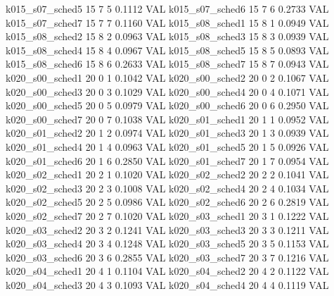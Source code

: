   k015_s07_sched5                   15    7   5    0.1112  VAL
  k015_s07_sched6                   15    7   6    0.2733  VAL
  k015_s07_sched7                   15    7   7    0.1160  VAL
  k015_s08_sched1                   15    8   1    0.0949  VAL
  k015_s08_sched2                   15    8   2    0.0963  VAL
  k015_s08_sched3                   15    8   3    0.0939  VAL
  k015_s08_sched4                   15    8   4    0.0967  VAL
  k015_s08_sched5                   15    8   5    0.0893  VAL
  k015_s08_sched6                   15    8   6    0.2633  VAL
  k015_s08_sched7                   15    8   7    0.0943  VAL
  k020_s00_sched1                   20    0   1    0.1042  VAL
  k020_s00_sched2                   20    0   2    0.1067  VAL
  k020_s00_sched3                   20    0   3    0.1029  VAL
  k020_s00_sched4                   20    0   4    0.1071  VAL
  k020_s00_sched5                   20    0   5    0.0979  VAL
  k020_s00_sched6                   20    0   6    0.2950  VAL
  k020_s00_sched7                   20    0   7    0.1038  VAL
  k020_s01_sched1                   20    1   1    0.0952  VAL
  k020_s01_sched2                   20    1   2    0.0974  VAL
  k020_s01_sched3                   20    1   3    0.0939  VAL
  k020_s01_sched4                   20    1   4    0.0963  VAL
  k020_s01_sched5                   20    1   5    0.0926  VAL
  k020_s01_sched6                   20    1   6    0.2850  VAL
  k020_s01_sched7                   20    1   7    0.0954  VAL
  k020_s02_sched1                   20    2   1    0.1020  VAL
  k020_s02_sched2                   20    2   2    0.1041  VAL
  k020_s02_sched3                   20    2   3    0.1008  VAL
  k020_s02_sched4                   20    2   4    0.1034  VAL
  k020_s02_sched5                   20    2   5    0.0986  VAL
  k020_s02_sched6                   20    2   6    0.2819  VAL
  k020_s02_sched7                   20    2   7    0.1020  VAL
  k020_s03_sched1                   20    3   1    0.1222  VAL
  k020_s03_sched2                   20    3   2    0.1241  VAL
  k020_s03_sched3                   20    3   3    0.1211  VAL
  k020_s03_sched4                   20    3   4    0.1248  VAL
  k020_s03_sched5                   20    3   5    0.1153  VAL
  k020_s03_sched6                   20    3   6    0.2855  VAL
  k020_s03_sched7                   20    3   7    0.1216  VAL
  k020_s04_sched1                   20    4   1    0.1104  VAL
  k020_s04_sched2                   20    4   2    0.1122  VAL
  k020_s04_sched3                   20    4   3    0.1093  VAL
  k020_s04_sched4                   20    4   4    0.1119  VAL

